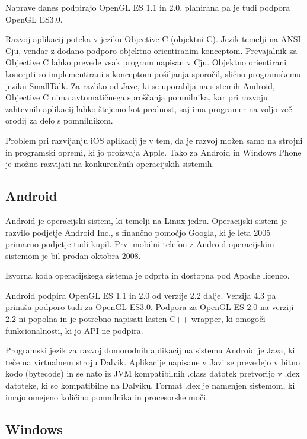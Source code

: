 Naprave danes podpirajo OpenGL ES 1.1 in 2.0, planirana pa je tudi podpora OpenGL ES3.0. 

Razvoj aplikacij poteka v jeziku Objective C (objektni C). Jezik temelji na ANSI Cju, vendar z dodano podporo objektno orientiranim konceptom. Prevajalnik za Objective C lahko prevede vsak program napisan v Cju. Objektno orientirani koncepti so implementirani s konceptom pošiljanja sporočil, slično programskemu jeziku SmallTalk. Za razliko od Jave, ki se uporablja na sistemih Android, Objective C nima avtomatičnega sproščanja pomnilnika, kar pri razvoju zahtevnih aplikacij lahko štejemo kot prednost, saj ima programer na voljo več orodij za delo s pomnilnikom. 

Problem pri razvijanju iOS aplikacij je v tem, da je razvoj možen samo na strojni in programski opremi, ki jo proizvaja Apple. Tako za Android in Windows Phone je možno razvijati na konkurenčnih operacijskih sistemih.

\subsection{Android}

Android je operacijski sistem, ki temelji na Linux jedru. Operacijski sistem je razvilo podjetje Android Inc., s finančno pomočjo Googla, ki je leta 2005 primarno podjetje tudi kupil. Prvi mobilni telefon z Android operacijskim sistemom je bil prodan oktobra 2008.

Izvorna koda operacijskega sistema je odprta in dostopna pod Apache licenco.

Android podpira OpenGL ES 1.1 in 2.0 od verzije 2.2 dalje. Verzija 4.3 pa prinaša podporo tudi za OpenGL ES3.0. Podpora za OpenGL ES 2.0 na verziji 2.2 ni popolna in je potrebno napisati lasten C++ wrapper, ki omogoči funkcionalnosti, ki jo API ne podpira.


Programski jezik za razvoj domorodnih aplikacij na sistemu Android je Java, ki teče na virtualnem stroju Dalvik. Aplikacije napisane v Javi se prevedejo v bitno kodo (bytecode) in se nato iz JVM kompatibilnih .class datotek pretvorijo v .dex datoteke, ki so kompatibilne na Dalviku. Format .dex je namenjen sistemom, ki imajo omejeno količino pomnilnika in procesorske moči.

\subsection{Windows}

